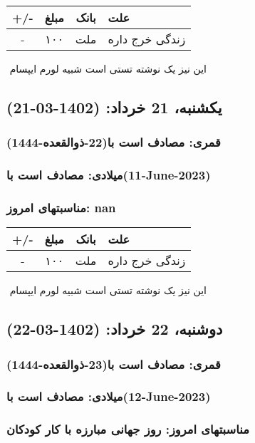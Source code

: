 \documentclass{article}
\newcommand{\rnote}[1]{\marginpar{\textcolor{color}{\StrSubstitute{\##1}{ }{\_}}}}
\newcommand{\myRow}[4]{
    #1 & #2 & #3 & #4 \\ \hline
}
\begin{document}
\begin{tabular}{ | c | c | c | p{5cm} |}
    \hline
    \myRow{ +/- }{مبلغ}{بانک}{علت}
    \myRow{-}{۱۰۰}{ملت}{زندگی خرج داره}
\end{tabular}
\newline
\newline

‌
\rnote{تست}
این نیز یک نوشته تستی است شبیه لورم ایپسام




\newpage
{}
\textcolor{color}{
\section{ یکشنبه، 21 خرداد: (1402-03-21) }
\subsubsection*{قمری: مصادف است با(22-ذوالقعده-1444)} 
\subsubsection*{میلادی: مصادف است با(11-June-2023)}
\subsubsection*{مناسبتهای امروز: nan}
}


\begin{tabular}{ | c | c | c | p{5cm} |}
    \hline
    \myRow{ +/- }{مبلغ}{بانک}{علت}
    \myRow{-}{۱۰۰}{ملت}{زندگی خرج داره}
\end{tabular}
\newline
\newline

‌
\rnote{تست}
این نیز یک نوشته تستی است شبیه لورم ایپسام




\newpage
{}
\textcolor{color}{
\section{ دوشنبه، 22 خرداد: (1402-03-22) }
\subsubsection*{قمری: مصادف است با(23-ذوالقعده-1444)} 
\subsubsection*{میلادی: مصادف است با(12-June-2023)}
\subsubsection*{مناسبتهای امروز: روز جهانی مبارزه با کار کودکان}
}
\end{document}
